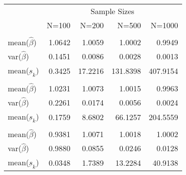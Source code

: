 
\begin{tabular}{lrrrr}
\toprule
\multicolumn{1}{c}{ } & \multicolumn{4}{c}{Sample Sizes} \\
\cmidrule(l{3pt}r{3pt}){2-5}
  & N=100 & N=200 & N=500 & N=1000\\
\midrule
\addlinespace[0.3em]
\multicolumn{5}{l}{\textbf{$ \rho = 0 $  }}\\
\hspace{1em}mean($\hat{\beta}$) & 1.0642 & 1.0059 & 1.0002 & 0.9949\\
\hspace{1em}var($\hat{\beta}$) & 0.1451 & 0.0086 & 0.0028 & 0.0013\\
\hspace{1em}mean($\underbar{s}_k$) & 0.3425 & 17.2216 & 131.8398 & 407.9154\\
\addlinespace[0.3em]
\multicolumn{5}{l}{\textbf{$ \rho = 0.5 $}}\\
\hspace{1em}mean($\hat{\beta}$) & 1.0231 & 1.0073 & 1.0015 & 0.9963\\
\hspace{1em}var($\hat{\beta}$) & 0.2261 & 0.0174 & 0.0056 & 0.0024\\
\hspace{1em}mean($\underbar{s}_k$) & 0.1759 & 8.6802 & 66.1257 & 204.5559\\
\addlinespace[0.3em]
\multicolumn{5}{l}{\textbf{$ \rho = 0.9 $}}\\
\hspace{1em}mean($\hat{\beta}$) & 0.9381 & 1.0071 & 1.0018 & 1.0002\\
\hspace{1em}var($\hat{\beta}$) & 0.9880 & 0.0855 & 0.0246 & 0.0128\\
\hspace{1em}mean($\underbar{s}_k$) & 0.0348 & 1.7389 & 13.2284 & 40.9138\\
\bottomrule
\end{tabular}
